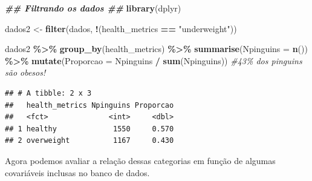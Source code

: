 \documentclass[
]{book}
\newenvironment{Shaded}{\begin{snugshade}}{\end{snugshade}}
\newcommand{\AttributeTok}[1]{\textcolor[rgb]{0.13,0.29,0.53}{#1}}
\newcommand{\CommentTok}[1]{\textcolor[rgb]{0.56,0.35,0.01}{\textit{#1}}}
\newcommand{\DecValTok}[1]{\textcolor[rgb]{0.00,0.00,0.81}{#1}}
\newcommand{\DocumentationTok}[1]{\textcolor[rgb]{0.56,0.35,0.01}{\textbf{\textit{#1}}}}
\newcommand{\FloatTok}[1]{\textcolor[rgb]{0.00,0.00,0.81}{#1}}
\newcommand{\FunctionTok}[1]{\textcolor[rgb]{0.13,0.29,0.53}{\textbf{#1}}}
\newcommand{\NormalTok}[1]{#1}
\newcommand{\OtherTok}[1]{\textcolor[rgb]{0.56,0.35,0.01}{#1}}
\newcommand{\SpecialCharTok}[1]{\textcolor[rgb]{0.81,0.36,0.00}{\textbf{#1}}}
\newcommand{\StringTok}[1]{\textcolor[rgb]{0.31,0.60,0.02}{#1}}
\begin{document}
\begin{Shaded}
\begin{Highlighting}[]
\DocumentationTok{\#\# Filtrando os dados \#\#}
\FunctionTok{library}\NormalTok{(dplyr)}

\NormalTok{dados2 }\OtherTok{\textless{}{-}} \FunctionTok{filter}\NormalTok{(dados, }\SpecialCharTok{!}\NormalTok{(health\_metrics }\SpecialCharTok{==} \StringTok{"underweight"}\NormalTok{))}


\NormalTok{dados2 }\SpecialCharTok{\%\textgreater{}\%}
  \FunctionTok{group\_by}\NormalTok{(health\_metrics) }\SpecialCharTok{\%\textgreater{}\%} 
  \FunctionTok{summarise}\NormalTok{(}\AttributeTok{Npinguins =} \FunctionTok{n}\NormalTok{()) }\SpecialCharTok{\%\textgreater{}\%}
  \FunctionTok{mutate}\NormalTok{(}\AttributeTok{Proporcao =}\NormalTok{ Npinguins }\SpecialCharTok{/} \FunctionTok{sum}\NormalTok{(Npinguins)) }\CommentTok{\#43\% dos pinguins são obesos!}
\end{Highlighting}
\end{Shaded}

\begin{verbatim}
## # A tibble: 2 x 3
##   health_metrics Npinguins Proporcao
##   <fct>              <int>     <dbl>
## 1 healthy             1550     0.570
## 2 overweight          1167     0.430
\end{verbatim}

Agora podemos avaliar a relação dessas categorias em função de algumas covariáveis inclusas no banco de dados.

\begin{Shaded}
\end{Shaded}
\end{document}
